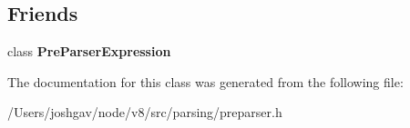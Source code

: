 \subsection*{Friends}
\begin{DoxyCompactItemize}
\item 
class {\bfseries Pre\+Parser\+Expression}\hypertarget{classv8_1_1internal_1_1_pre_parser_identifier_abadb8c3c970501a35d2b45b9512eba94}{}\label{classv8_1_1internal_1_1_pre_parser_identifier_abadb8c3c970501a35d2b45b9512eba94}

\end{DoxyCompactItemize}


The documentation for this class was generated from the following file\+:\begin{DoxyCompactItemize}
\item 
/\+Users/joshgav/node/v8/src/parsing/preparser.\+h\end{DoxyCompactItemize}
